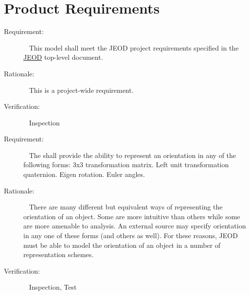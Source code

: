 
\chapter{Product Requirements}\label{ch:reqt}

\label{reqt:toplevel}
\begin{description}
\item[Requirement:]\ \newline
  This model shall meet the JEOD project requirements specified in the 
  \hyperref{file:\JEODHOME/docs/JEOD.pdf}{part1}{reqt}{JEOD} top-level document.

\item[Rationale:]\ \newline
  This is a project-wide requirement.

\item[Verification:]\ \newline
  Inspection
\end{description}


\label{reqt:representations}
\begin{description}
\item[Requirement:]\ \newline
  The \ModelDesc shall provide the ability to represent an orientation
  in any of the following forms:
  \subrequirement{}3x3 transformation matrix.
  \subrequirement{}Left unit transformation quaternion.
  \subrequirement{}Eigen rotation.
  \subrequirement{}Euler angles.

\item[Rationale:]\ \newline
  There are many different but equivalent ways of representing the orientation
  of an object. Some are more intuitive than others while some are more
  amenable to analysis. An external source may specify orientation in any
  one of these forms (and others as well).  For these reasons, JEOD must be
  able to model the orientation of an object in a number of representation
  schemes.

\item[Verification:]\ \newline
  Inspection, Test
\end{description}


